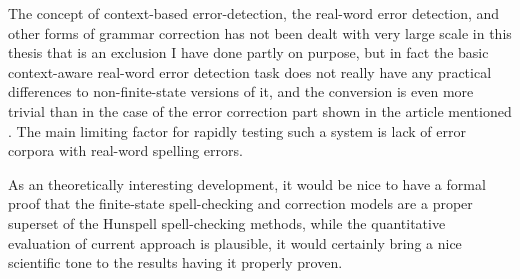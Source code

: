 \documentclass[officiallayout,draft]{unihelcompling}
\begin{document}
The concept of context-based error-detection, the real-word error detection,
and other forms of grammar correction has not been dealt with very large scale
in this thesis that is an exclusion I have done partly on purpose, but in
fact the basic context-aware real-word error detection task does not really
have any practical differences to non-finite-state versions of it, and the
conversion is even more trivial than in the case of the error correction part
shown in the article mentioned . The main
limiting factor for rapidly testing such a system is lack of error corpora
with real-word spelling errors.

As an theoretically interesting development, it would be nice to have a formal
proof that the finite-state spell-checking and correction models are a proper
superset of the Hunspell spell-checking methods, while the quantitative
evaluation of current approach is plausible, it would certainly bring a nice
scientific tone to the results having it properly proven.



\end{document}
